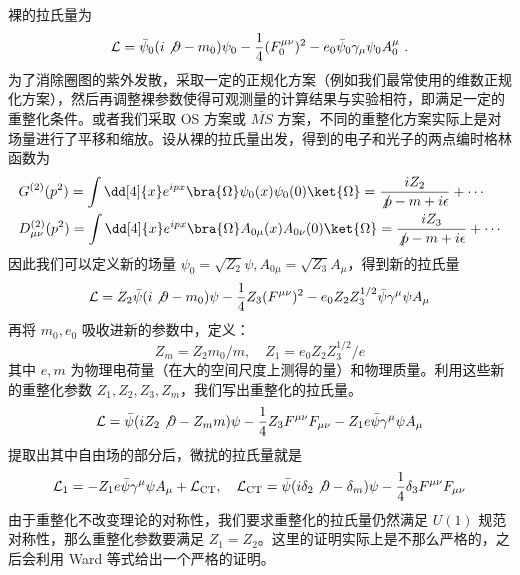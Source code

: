 

裸的拉氏量为
\begin{equation}
\begin{aligned}
\mathcal{L}=
\bar{\psi}_0 (i\not\partial -m_0)\psi_0 -\frac{1}{4}(F_0^{\mu\nu})^2 - e_0\bar\psi_0 \gamma_\mu\psi_0 A_0^\mu~.
\end{aligned}
\end{equation}
为了消除圈图的紫外发散，采取一定的正规化方案（例如我们最常使用的维数正规化方案），然后再调整裸参数使得可观测量的计算结果与实验相符，即满足一定的重整化条件。或者我们采取 OS 方案或 $\overline{MS}$ 方案，不同的重整化方案实际上是对场量进行了平移和缩放。设从裸的拉氏量出发，得到的电子和光子的两点编时格林函数为
\begin{equation}
\begin{aligned}
&G^{(2)}(p^2)=\int\dd[4]{x} e^{ipx} \bra{\Omega}\psi_0(x)\psi_0(0)\ket{\Omega}=\frac{iZ_2}{\not p-m+i\epsilon} + \cdots\\
&D_{\mu\nu}^{(2)}(p^2)=\int\dd[4]{x} e^{ipx} \bra{\Omega}A_{0\mu}(x)A_{0\nu}(0)\ket{\Omega}=\frac{iZ_3}{\not p-m+i\epsilon}+\cdots
\end{aligned}
\end{equation}
因此我们可以定义新的场量 $\psi_0=\sqrt{Z_2} \psi,A_{0\mu} = \sqrt{Z_3} A_\mu$，得到新的拉氏量
\begin{equation}
\mathcal{L} = Z_2\bar\psi (i\not\partial - m_0)\psi - \frac{1}{4}Z_3 (F^{\mu\nu})^2-e_0Z_2Z_3^{1/2} \bar\psi \gamma^\mu\psi A_\mu
\end{equation}
再将 $m_0,e_0$ 吸收进新的参数中，定义：
\begin{equation}
Z_m = Z_2 m_0 / m,\quad Z_1 = e_0Z_2Z_3^{1/2} / e
\end{equation}
其中 $e,m$ 为物理电荷量（在大的空间尺度上测得的量）和物理质量。利用这些新的重整化参数 $Z_1,Z_2,Z_3,Z_m$，我们写出重整化的拉氏量。
\begin{equation}
\begin{aligned}
\mathcal{L} = \bar\psi (iZ_2\not\partial - Z_m m)\psi -\frac{1}{4}Z_3F^{\mu\nu}F_{\mu\nu}-Z_1 e\bar\psi \gamma^\mu \psi A_\mu
\end{aligned}
\end{equation}
提取出其中自由场的部分后，微扰的拉氏量就是
\begin{equation}
\mathcal{L}_1 = - Z_1 e \bar\psi \gamma^\mu\psi A_\mu + \mathcal{L}_\text{CT},\quad \mathcal{L}_\text{CT} = \bar\psi (i\delta_2 \not\partial - \delta_m)\psi - \frac{1}{4}\delta_3 F^{\mu\nu}F_{\mu\nu}
\end{equation}
由于重整化不改变理论的对称性，我们要求重整化的拉氏量仍然满足 $U(1)$ 规范对称性，那么重整化参数要满足 $Z_1=Z_2$。这里的证明实际上是不那么严格的，之后会利用 Ward 等式给出一个严格的证明。
